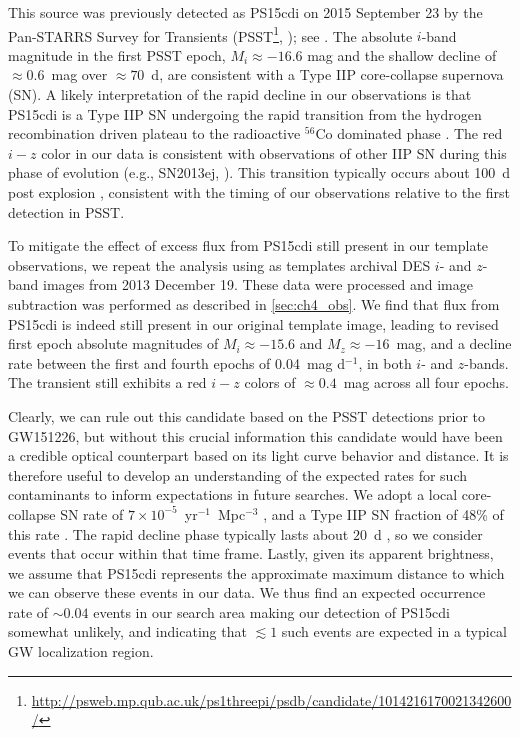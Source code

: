 \clearpage
This source was previously detected as PS15cdi on 2015 September 23 by the Pan-STARRS
Survey for Transients (PSST\footnote{\singlespace \url{http://psweb.mp.qub.ac.uk/ps1threepi/psdb/candidate/1014216170021342600/}},
\citealt{Huber+15}); see . The absolute $i$-band
magnitude in the first PSST epoch, $M_i\approx -16.6$ mag and the shallow decline of $\approx0.6$~mag
over $\approx70$~d, are consistent with a Type IIP core-collapse supernova (SN).
A likely interpretation of the rapid decline in our observations is that PS15cdi is a Type IIP SN undergoing
the rapid transition from the hydrogen recombination driven plateau to the radioactive $^{56}$Co dominated
phase \citep{KasenWoosley09,Sanders+15,Dhungana+16}. The red $i-z$ color in our data is consistent with observations
of other IIP SN during this phase of evolution (e.g., SN2013ej, \citealt{Dhungana+16}).
This transition typically occurs about 100~d post explosion \citep{KasenWoosley09,Sanders+15,Dhungana+16}, consistent with the
timing of our observations relative to the first detection in PSST.

To mitigate the effect of excess flux from PS15cdi still present in our template observations, we repeat the analysis
using as templates archival DES $i$- and $z$-band images from 2013 December 19. These data were processed
and image subtraction was performed as described in \cref{sec:ch4_obs}. We find that flux from PS15cdi is indeed still present
in our original template image, leading to revised first epoch absolute magnitudes of $M_i \approx -15.6$ and
$M_z \approx -16$~mag, and a decline rate between the first and fourth epochs of 0.04~mag d$^{-1}$, in both
$i$- and $z$-bands. The transient still exhibits a red $i-z$ colors of $\approx 0.4$~mag across all four epochs.

\clearpage
Clearly, we can rule out this candidate based on the PSST detections prior to
GW151226, but without this crucial information this candidate
would have been a credible optical counterpart based on its light curve behavior and distance.
It is therefore useful to develop an understanding of the expected rates for such contaminants
to inform expectations in future searches. We adopt a local core-collapse SN rate of
$7\times10^{-5}$~yr$^{-1}$~Mpc$^{-3}$ \citep{Li+11,Cappellaro+15},
and a Type IIP SN fraction of 48\% of this rate \citep{Smith+11}. The rapid
decline phase typically lasts about $20$~d \citep{KasenWoosley09,Sanders+15,Dhungana+16},
so we consider events that occur within that time frame. Lastly, given its apparent brightness,
we assume that PS15cdi represents the approximate maximum distance to which we can observe
these events in our data. We thus find an expected occurrence rate of $\sim 0.04$ events in our search area
making our detection of PS15cdi somewhat unlikely, and indicating that $\lesssim 1$ such
events are expected in a typical GW localization region.

